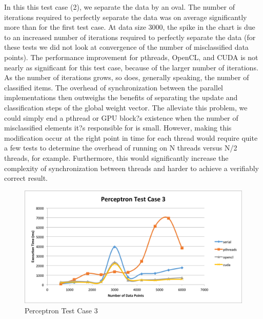 \documentclass{article}
\begin{document}
In this this test case (2), we separate the data by an oval. The number of iterations required to perfectly separate the data was on average significantly more than for the first test case. At data size 3000, the spike in the chart is due to an increased number of iterations required to perfectly separate the data (for these tests we did not look at convergence of the number of misclassified data points). The performance improvement for pthreads, OpenCL, and CUDA is not nearly as significant for this test case, because of the larger number of iterations. As the number of iterations grows, so does, generally speaking, the number of classified items. The overhead of synchronization between the parallel implementations then outweighs the benefits of separating the update and classification steps of the global weight vector. The alleviate this problem, we could simply end a pthread or GPU block?s existence when the number of misclassified elements it?s responsible for is small. However, making this modification occur at the right point in time for each thread would require quite a few tests to determine the overhead of running on N threads versus N/2 threads, for example. Furthermore, this would significantly increase the complexity of synchronization between threads and harder to achieve a verifiably correct result.
\clearpage
\begin{figure}[!htbp]
\begin{center}
\includegraphics[width=1.0\textwidth]{PerceptronTestCase3} %
\caption{Perceptron Test Case 3}
\end{center}
\end{figure}
\end{document}
